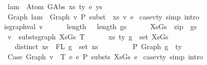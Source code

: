 \begin{isabellebody}
\ \ \ \ \ lam\ {\isasymsimeq}\ Atom\ {\isacharparenleft}{\kern0pt}GAbs\ xs\ ty\ e{\isacharparenright}{\kern0pt}\ ys\ {\isacharequal}{\kern0pt}{\isacharequal}{\kern0pt}{\isachargreater}{\kern0pt}\isanewline
\ \ \ \ \ Graph\ lam\ {\isasymcdot}\ Graph\ v\ {\isacharminus}{\kern0pt}{\isachargreater}{\kern0pt}{\isacharbraceleft}{\kern0pt}P{\isacharbraceright}{\kern0pt}\ subst\ {}\ xs\ v\ e{\isachardoublequoteclose}\isanewline
{\isacharbar}{\kern0pt}\ case{}{\isacharunderscore}{\kern0pt}v{\isacharunderscore}{\kern0pt}ty\ {\isacharbrackleft}{\kern0pt}simp{\isacharcomma}{\kern0pt}\ intro{\isacharbrackright}{\kern0pt}{\isacharcolon}{\kern0pt}\isanewline
\ \ \ \ {\isachardoublequoteopen}is{\isacharunderscore}{\kern0pt}graph{\isacharunderscore}{\kern0pt}val\ v\ {\isacharequal}{\kern0pt}{\isacharequal}{\kern0pt}{\isachargreater}{\kern0pt}\isanewline
\ \ \ \ \ length\ {\isasymGamma}\ {\isacharequal}{\kern0pt}\ length\ gs\ {\isacharequal}{\kern0pt}{\isacharequal}{\kern0pt}{\isachargreater}{\kern0pt}\isanewline
\ \ \ \ \ XsGs\ {\isacharequal}{\kern0pt}\ zip\ {\isasymGamma}\ gs\ {\isacharequal}{\kern0pt}{\isacharequal}{\kern0pt}{\isachargreater}{\kern0pt}\isanewline
\ \ \ \ \ v\ {\isasymsimeq}\ substs{\isacharunderscore}{\kern0pt}graph\ XsGs\ T\ {\isacharequal}{\kern0pt}{\isacharequal}{\kern0pt}{\isachargreater}{\kern0pt}\isanewline
\ \ \ \ \ {\isasymforall}{\isacharparenleft}{\kern0pt}{\isacharparenleft}{\kern0pt}xs{\isacharcomma}{\kern0pt}\ ty{\isacharparenright}{\kern0pt}{\isacharcomma}{\kern0pt}\ g{\isacharparenright}{\kern0pt}\ {\isasymin}\ set\ XsGs{\isachardot}{\kern0pt}\ {\isacharparenleft}{\kern0pt}\isanewline
\ \ \ \ \ \ \ distinct\ xs\ {\isasymand}\ FL\ g\ {\isacharequal}{\kern0pt}\ set\ xs\ {\isasymand}\isanewline
\ \ \ \ \ \ \ {\isacharbrackleft}{\kern0pt}{\isacharbrackright}{\kern0pt}\ {\isasymturnstile}{\isacharbraceleft}{\kern0pt}P{\isacharbraceright}{\kern0pt}\ {\isacharparenleft}{\kern0pt}Graph\ g{\isacharparenright}{\kern0pt}\ {\isacharcolon}{\kern0pt}\ ty\isanewline
\ \ \ \ \ {\isacharparenright}{\kern0pt}\ {\isacharequal}{\kern0pt}{\isacharequal}{\kern0pt}{\isachargreater}{\kern0pt}\isanewline
\ \ \ \ \ Case\ {\isacharparenleft}{\kern0pt}Graph\ v{\isacharparenright}{\kern0pt}\ {\isasymGamma}\ T\ e{}\ e{}\ {\isacharminus}{\kern0pt}{\isachargreater}{\kern0pt}{\isacharbraceleft}{\kern0pt}P{\isacharbraceright}{\kern0pt}\ substs\ XsGs\ e{}{\isachardoublequoteclose}\isanewline
{\isacharbar}{\kern0pt}\ case{}{\isacharunderscore}{\kern0pt}v{\isacharunderscore}{\kern0pt}ty\ {\isacharbrackleft}{\kern0pt}simp{\isacharcomma}{\kern0pt}\ intro{\isacharbrackright}{\kern0pt}{\isacharcolon}{\kern0pt}\isanewline

\end{isabellebody}
